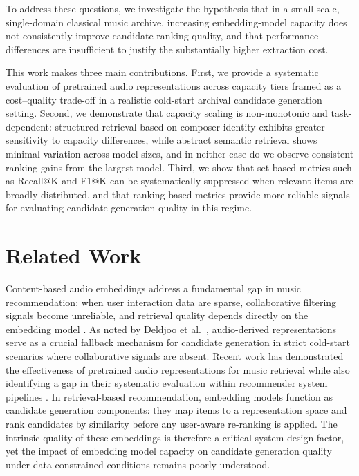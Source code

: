 \documentclass[sigconf]{acmart}
\begin{document}
To address these questions, we investigate the hypothesis that in a small-scale, single-domain classical music archive, increasing embedding-model capacity does not consistently improve candidate ranking quality, and that performance differences are insufficient to justify the substantially higher extraction cost. 

This work makes three main contributions. First, we provide a systematic evaluation of pretrained audio representations across capacity tiers framed as a cost--quality trade-off in a realistic cold-start archival candidate generation setting. Second, we demonstrate that capacity scaling is non-monotonic and task-dependent: structured retrieval based on composer identity exhibits greater sensitivity to capacity differences, while abstract semantic retrieval shows minimal variation across model sizes, and in neither case do we observe consistent ranking gains from the largest model. Third, we show that set-based metrics such as Recall@K and F1@K can be systematically suppressed when relevant items are broadly distributed, and that ranking-based metrics provide more reliable signals for evaluating candidate generation quality in this regime.

\section{Related Work}\label{sec:related-work}

Content-based audio embeddings address a fundamental gap in music recommendation: when user interaction data are sparse, collaborative filtering signals become unreliable, and retrieval quality depends directly on the embedding model \cite{schedl2018}. As noted by Deldjoo et al.\ \cite{deldjoo2024}, audio-derived representations serve as a crucial fallback mechanism for candidate generation in strict cold-start scenarios where collaborative signals are absent. Recent work has demonstrated the effectiveness of pretrained audio representations for music retrieval while also identifying a gap in their systematic evaluation within recommender system pipelines \cite{tamm2024}. In retrieval-based recommendation, embedding models function as candidate generation components: they map items to a representation space and rank candidates by similarity before any user-aware re-ranking is applied. The intrinsic quality of these embeddings is therefore a critical system design factor, yet the impact of embedding model capacity on candidate generation quality under data-constrained conditions remains poorly understood.
\end{document}
